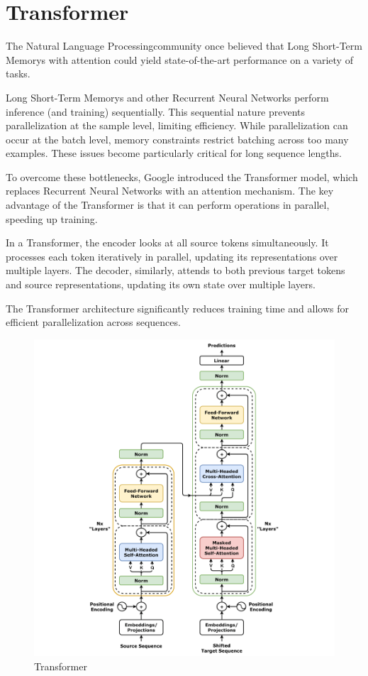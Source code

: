 \section{Transformer}

The Natural Language Processingcommunity once believed that Long Short-Term Memorys with attention could yield state-of-the-art performance on a variety of tasks. 

Long Short-Term Memorys and other Recurrent Neural Networks perform inference (and training) sequentially.
This sequential nature prevents parallelization at the sample level, limiting efficiency.
While parallelization can occur at the batch level, memory constraints restrict batching across too many examples.
These issues become particularly critical for long sequence lengths.

To overcome these bottlenecks, Google introduced the Transformer model, which replaces Recurrent Neural Networks with an attention mechanism. 
The key advantage of the Transformer is that it can perform operations in parallel, speeding up training.

In a Transformer, the encoder looks at all source tokens simultaneously. 
It processes each token iteratively in parallel, updating its representations over multiple layers.
The decoder, similarly, attends to both previous target tokens and source representations, updating its own state over multiple layers.

The Transformer architecture significantly reduces training time and allows for efficient parallelization across sequences.
\begin{figure}[H]
    \centering
    \includegraphics[width=0.75\linewidth]{images/trans.png}
    \caption{Transformer}
\end{figure}

